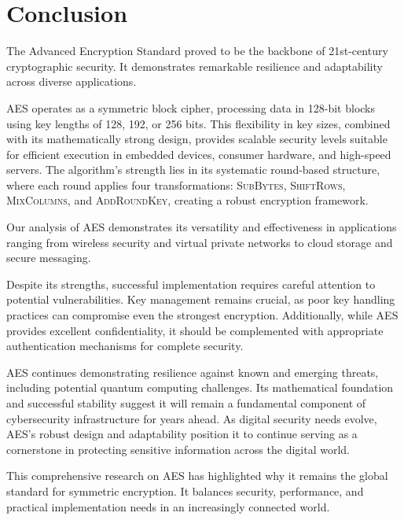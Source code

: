 \section{Conclusion}

The Advanced Encryption Standard proved to be the backbone of 21st-century cryptographic security. 
It demonstrates remarkable resilience and adaptability across diverse applications.

AES operates as a symmetric block cipher, processing data in 128-bit blocks using key lengths of 128, 192, or 256 bits.
This flexibility in key sizes, combined with its mathematically strong design, provides scalable security levels suitable for efficient execution in embedded devices, consumer hardware, and high-speed servers. 
The algorithm's strength lies in its systematic round-based structure, where each round applies four transformations: \textsc{SubBytes}, \textsc{ShiftRows}, \textsc{MixColumns}, and \textsc{AddRoundKey}, creating a robust encryption framework.

Our analysis of AES demonstrates its versatility and effectiveness in applications ranging from wireless security and virtual private networks to cloud storage and secure messaging.

Despite its strengths, successful implementation requires careful attention to potential vulnerabilities.
 Key management remains crucial, as poor key handling practices can compromise even the strongest encryption. 
 Additionally, while AES provides excellent confidentiality, it should be complemented with appropriate authentication mechanisms for complete security.

AES continues demonstrating resilience against known and emerging threats, including potential quantum computing challenges. 
Its mathematical foundation and successful stability suggest it will remain a fundamental component of cybersecurity infrastructure for years ahead. 
As digital security needs evolve, AES's robust design and adaptability position it to continue serving as a cornerstone in protecting sensitive information across the digital world.

This comprehensive research on AES has highlighted why it remains the global standard for symmetric encryption. 
It balances security, performance, and practical implementation needs in an increasingly connected world.

